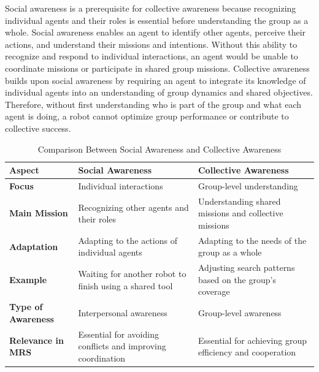 \documentclass{book}
\begin{document}
Social awareness is a prerequisite for collective awareness because recognizing individual agents and their roles is essential before understanding the group as a whole. Social awareness enables an agent to identify other agents, perceive their actions, and understand their missions and intentions. Without this ability to recognize and respond to individual interactions, an agent would be unable to coordinate missions or participate in shared group missions. Collective awareness builds upon social awareness by requiring an agent to integrate its knowledge of individual agents into an understanding of group dynamics and shared objectives. Therefore, without first understanding who is part of the group and what each agent is doing, a robot cannot optimize group performance or contribute to collective success.
\begin{table}[h!]
    \centering
    \begin{tabular}{|l|l|l|}
        \hline
        \textbf{Aspect}            & \textbf{Social Awareness}                                   & \textbf{Collective Awareness}                            \\ \hline
        \textbf{Focus}             & Individual interactions                                     & Group-level understanding                                \\ \hline
        \textbf{Main Mission}         & Recognizing other agents and their roles                    & Understanding shared missions and collective missions          \\ \hline
        \textbf{Adaptation}        & Adapting to the actions of individual agents                & Adapting to the needs of the group as a whole            \\ \hline
        \textbf{Example}           & Waiting for another robot to finish using a shared tool     & Adjusting search patterns based on the group’s coverage  \\ \hline
        \textbf{Type of Awareness} & Interpersonal awareness                                     & Group-level awareness                                    \\ \hline
        \textbf{Relevance in MRS}  & Essential for avoiding conflicts and improving coordination     & Essential for achieving group efficiency and cooperation         \\ \hline
    \end{tabular}
    \caption{Comparison Between Social Awareness and Collective Awareness}
\end{table}
\end{document}
